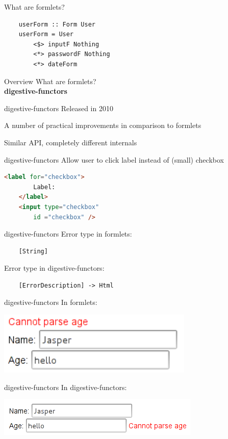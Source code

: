 \documentclass[20pt]{beamer}
\newcommand{\vspaced}{
    \vspace{5mm}
}
\begin{document}
\begin{frame}[fragile]{What are formlets?}
    \begin{lstlisting}
    userForm :: Form User
    userForm = User
        <$> inputF Nothing
        <*> passwordF Nothing
        <*> dateForm
    \end{lstlisting}
\end{frame}


\begin{frame}{Overview}
    What are formlets? \\
    \textbf{digestive-functors} \\
\end{frame}

\begin{frame}{digestive-functors}
    Released in 2010 \\
    \vspaced
    A number of practical improvements in comparison to formlets \\
    \vspaced
    Similar API, completely different internals
\end{frame}

\begin{frame}[fragile]{digestive-functors}
    Allow user to click label instead of (small) checkbox \\
    \begin{lstlisting}[language=html]
    <label for="checkbox">
        Label:
    </label>
    <input type="checkbox"
        id ="checkbox" />
    \end{lstlisting}
\end{frame}

\begin{frame}[fragile]{digestive-functors}
    Error type in formlets:
    \begin{lstlisting}
    [String]
    \end{lstlisting}
    \vspaced
    Error type in digestive-functors:
    \begin{lstlisting}
    [ErrorDescription] -> Html
    \end{lstlisting}
\end{frame}

\begin{frame}[fragile]{digestive-functors}
    In formlets:
    \vspaced
    \begin{center}
    \includegraphics[width=0.7\textwidth]{images/errors-formlets.png}
    \end{center}
\end{frame}

\begin{frame}[fragile]{digestive-functors}
    In digestive-functors:
    \vspaced
    \begin{center}
    \includegraphics[width=\textwidth]{images/errors-digestive-functors.png}
    \end{center}
\end{frame}
\end{document}
